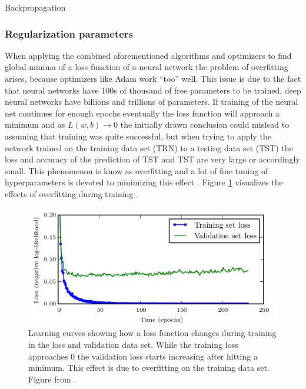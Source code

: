 Backpropagation \cite{rumelhart1988learning}

\subsubsection{Regularization parameters}

When applying the combined aforementioned algorithms and optimizers to find global minima of a loss function
of a neural network the problem of overfitting arises, because optimizers like Adam work ``too'' well. This
issue is due to the fact that neural networks have 100s of thousand of free parameters to be trained, deep
neural networks have billions and trillions of parameters. If training of the neural net continues for enough
epochs eventually the loss function will approach a minimum and as $ L(w,b)\rightarrow 0 $ the initially drawn
conclusion could mislead to assuming that training was quite successful, but when trying to apply the network trained on
the training data set (TRN) to a testing data set (TST) the loss and accuracy of the prediction of TST and
TST are very large or accordingly small. This phenomenon is know as overfitting and a lot of fine tuning of
hyperparameters is devoted to minimizing this effect \cite{tetko1995neural}. Figure \ref{fig:overfitting}
visualizes the effects of overfitting during training \cite{goodfellow2016deep}.

\begin{figure}[H]
   \centering \includegraphics[height=.35\textheight, width=1.1\textwidth]{Figures/overfitting} \decoRule
   \caption[Training vs. validation loss over time]{Learning curves showing how a loss function changes during training
     in the loss and validation data set. While the training loss approaches 0 the validation loss starts increasing
     after hitting a minimum. This effect is due to overfitting on the training data set. Figure from
     \cite{goodfellow2016deep}.}
 \label{fig:overfitting}
\end{figure}


